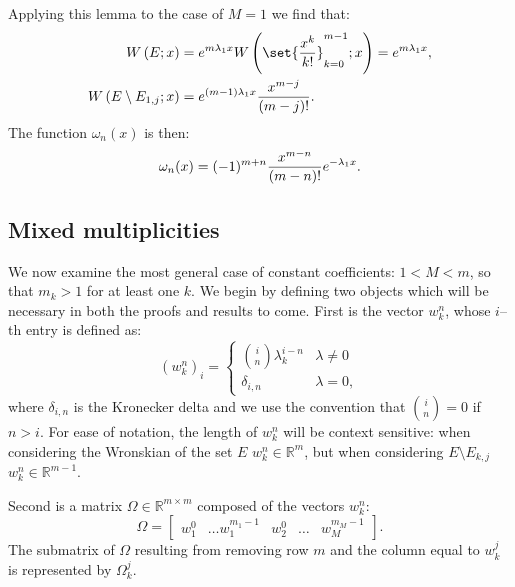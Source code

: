 \documentclass{article}
\begin{document}
Applying this lemma to the case of $M=1$ we find that:
\begin{align*}
\W{E}{x} & = e^{m \lambda_1 x} \W{\set{\Poly{k}}_{k=0}^{m-1}}{x} = e^{m \lambda_1 x} , \\
\W{E \setminus E_{1,j}}{x} & = e^{(m-1) \lambda_1 x} \poly{m-j} .
\end{align*}
The function $\omega_n(x)$ is then:
\begin{equation*}
\omega_n(x) = (-1)^{m+n} \frac{x^{m-n}}{(m-n)!} e^{-\lambda_1 x} .
\end{equation*}

\subsection{Mixed multiplicities}


We now examine the most general case of constant coefficients: $1 < M < m$, so that $m_k > 1$ for at least one $k$.
We begin by defining two objects which will be necessary in both the proofs and results to come.
First is the vector $w_k^n$, whose $i$--th entry is defined as:
\begin{equation*}
\left ( w_k^n \right )_i = \begin{cases} \binom{i}{n} \lambda_k^{i - n} & \lambda \neq 0 \\
\delta_{i,n} & \lambda = 0, \end{cases}
\end{equation*}
where $\delta_{i,n}$ is the Kronecker delta and we use the convention that $\binom{i}{n} = 0$ if $n>i$.
For ease of notation, the length of $w_k^n$ will be context sensitive: when considering the Wronskian of the set $E$ $w_k^n \in \mathbb{R}^m$, but when considering $E \setminus E_{k,j}$ $w_k^n \in \mathbb{R}^{m-1}$.

Second is a matrix $\Omega \in \mathbb{R}^{m \times m}$ composed of the vectors $w_k^n$:
\begin{equation*}
\Omega = \begin{bmatrix} w_1^0 & \dots w_1^{m_1 - 1} & w_2^0 & \dots & w_M^{m_M-1} \end{bmatrix} .
\end{equation*}
The submatrix of $\Omega$ resulting from removing row $m$ and the column equal to $w_k^j$ is represented by $\Omega_k^j$.
\end{document}

